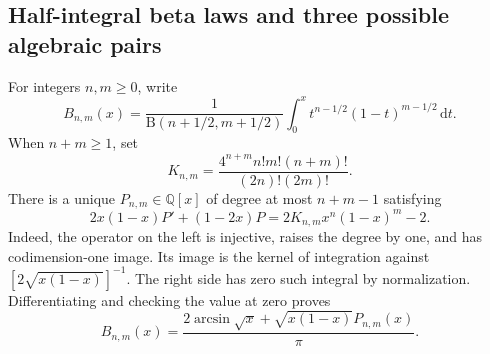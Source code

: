 \documentclass[11pt,a4paper]{article}
\numberwithin{equation}{section}
\theoremstyle{definition}
\theoremstyle{remark}
\newcommand{\Q}{\mathbb Q}
\newcommand{\B}{\mathrm B}
\newcommand{\dd}{\,\mathrm d}
\begin{document}
\subsection{Half-integral beta laws and three possible algebraic pairs}
For integers $n,m\ge0$, write
\[
 B_{n,m}(x)=\frac{1}{\B(n+1/2,m+1/2)}
 \int_0^x t^{n-1/2}(1-t)^{m-1/2}\dd t.
\]
When $n+m\ge1$, set
\[
 K_{n,m}=\frac{4^{n+m}n!m!(n+m)!}{(2n)!(2m)!}.
\]
There is a unique $P_{n,m}\in\Q[x]$ of degree at most $n+m-1$ satisfying
\begin{equation}\label{eq:half-beta-poly}
 2x(1-x)P'+(1-2x)P=2K_{n,m}x^n(1-x)^m-2.
\end{equation}
Indeed, the operator on the left is injective, raises the degree by one,
and has codimension-one image. Its image is the kernel of integration
against $[2\sqrt{x(1-x)}]^{-1}$. The right side has zero such integral by
normalization. Differentiating and checking the value at zero proves
\begin{equation}\label{eq:half-beta-primitive}
 B_{n,m}(x)=\frac{2\arcsin\sqrt x+
 \sqrt{x(1-x)}P_{n,m}(x)}\pi.
\end{equation}
\end{document}
